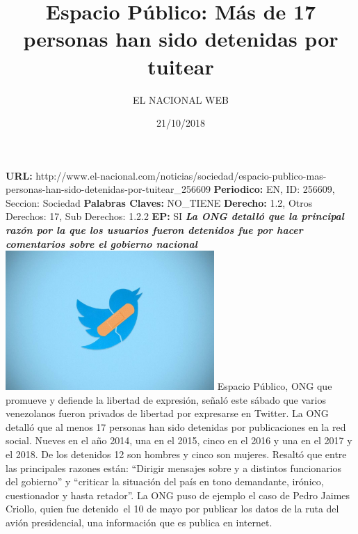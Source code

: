 \documentclass{article}%
\title{\textbf{Espacio Público: Más de 17 personas han sido detenidas por tuitear}}%
\author{EL NACIONAL WEB}%
\date{21/10/2018}%
\begin{document}
%
\normalsize%
\maketitle%
\textbf{URL: }%
http://www.el{-}nacional.com/noticias/sociedad/espacio{-}publico{-}mas{-}personas{-}han{-}sido{-}detenidas{-}por{-}tuitear\_256609\newline%
%
\textbf{Periodico: }%
EN, %
ID: %
256609, %
Seccion: %
Sociedad\newline%
%
\textbf{Palabras Claves: }%
NO\_TIENE\newline%
%
\textbf{Derecho: }%
1.2, %
Otros Derechos: %
17, %
Sub Derechos: %
1.2.2\newline%
%
\textbf{EP: }%
SI\newline%
\newline%
%
\textbf{\textit{La ONG detalló que la principal razón por la que los usuarios fueron detenidos fue por hacer comentarios sobre el gobierno nacional~}}%
\newline%
\newline%
%
\includegraphics[width=300px]{52.jpg}%
\newline%
%
Espacio Público, ONG que promueve y defiende la libertad de expresión, señaló este sábado que varios venezolanos fueron privados de libertad por expresarse en Twitter.%
\newline%
%
La ONG detalló que al menos 17 personas han sido detenidas por publicaciones en la red social. Nueves en el año 2014, una en el 2015, cinco en el 2016 y una en el 2017 y el 2018. De los detenidos 12 son hombres y cinco son mujeres.%
\newline%
%
Resaltó que entre las principales razones están: “Dirigir mensajes sobre y a distintos funcionarios del gobierno” y “criticar la situación del país en tono demandante, irónico, cuestionador y hasta retador”.%
\newline%
%
La ONG puso de ejemplo el caso de Pedro Jaimes Criollo, quien fue detenido~el 10 de mayo por publicar los datos de la ruta del avión presidencial, una información que es publica en internet.%
\newline%
%
\end{document}
